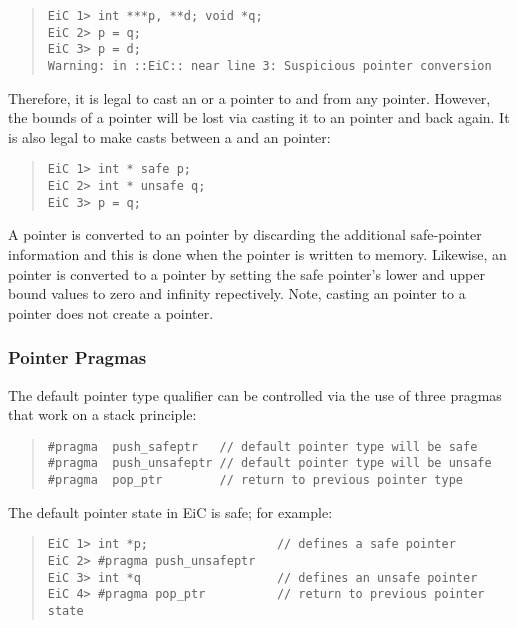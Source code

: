 \begin{quote}
\begin{verbatim}
EiC 1> int ***p, **d; void *q; 
EiC 2> p = q;
EiC 3> p = d;
Warning: in ::EiC:: near line 3: Suspicious pointer conversion
\end{verbatim}
\end{quote}

Therefore, it is legal to cast an  or a  pointer to
and from any  pointer. However, the bounds of a 
pointer will be lost via casting it to an  pointer and back
again. It is also legal to make casts between a  and an
 pointer:

\begin{quote}
\begin{verbatim}
EiC 1> int * safe p; 
EiC 2> int * unsafe q; 
EiC 3> p = q;
\end{verbatim}
\end{quote}
 
A  pointer is converted to an  pointer by discarding
the additional safe-pointer information and this is done when the
 pointer is written to memory. Likewise, an
 pointer is converted to a  pointer by setting
the safe pointer's lower and upper bound values to zero and infinity
repectively. Note, casting an  pointer to a  pointer
does not create a  pointer.

\subsubsection{Pointer Pragmas}
\label{sec:PointerPragmas}

The default pointer type qualifier can be controlled via the use of
three pragmas that work on a stack principle:

\begin{quote}
\begin{verbatim}
#pragma  push_safeptr   // default pointer type will be safe 
#pragma  push_unsafeptr // default pointer type will be unsafe
#pragma  pop_ptr        // return to previous pointer type 
\end{verbatim}
\end{quote}

The default pointer state in EiC is safe; for example:

\begin{quote}
\begin{verbatim}
EiC 1> int *p;                  // defines a safe pointer
EiC 2> #pragma push_unsafeptr
EiC 3> int *q                   // defines an unsafe pointer
EiC 4> #pragma pop_ptr          // return to previous pointer state
\end{verbatim}
\end{quote}

